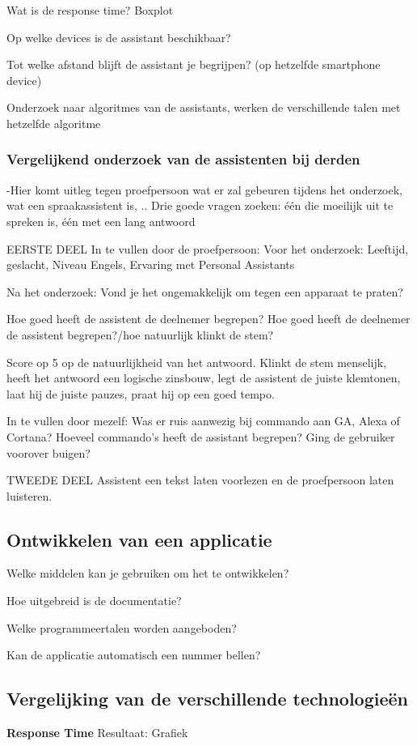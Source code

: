 Wat is de response time? Boxplot

Op welke devices is de assistant beschikbaar?

Tot welke afstand blijft de assistant je begrijpen? (op hetzelfde smartphone device)

Onderzoek naar algoritmes van de assistants, werken de verschillende talen met hetzelfde algoritme

\subsubsection{Vergelijkend onderzoek van de assistenten bij derden}
-Hier komt uitleg tegen proefpersoon wat er zal gebeuren tijdens het onderzoek, wat een spraakassistent is, ..
Drie goede vragen zoeken: één die moeilijk uit te spreken is, één met een lang antwoord

EERSTE DEEL
In te vullen door de proefpersoon:
Voor het onderzoek:
Leeftijd, geslacht, Niveau Engels, Ervaring met Personal Assistants

Na het onderzoek:
Vond je het ongemakkelijk om tegen een apparaat te praten?

Hoe goed heeft de assistent de deelnemer begrepen?
Hoe goed heeft de deelnemer de assistent begrepen?/hoe natuurlijk klinkt de stem?

Score op 5 op de natuurlijkheid van het antwoord. Klinkt de stem menselijk, heeft het antwoord een logische zinsbouw, legt de assistent de juiste klemtonen, laat hij de juiste pauzes, praat hij op een goed tempo.

In te vullen door mezelf:
Was er ruis aanwezig bij commando aan GA, Alexa of Cortana?
Hoeveel commando's heeft de assistant begrepen?
Ging de gebruiker voorover buigen?

TWEEDE DEEL
Assistent een tekst laten voorlezen en de proefpersoon laten luisteren.

\subsection{Ontwikkelen van een applicatie}
\label{sec:ontwikkelen van een applicatie}
Welke middelen kan je gebruiken om het te ontwikkelen?

Hoe uitgebreid is de documentatie?

Welke programmeertalen worden aangeboden?

Kan de applicatie automatisch een nummer bellen?

\subsection{Vergelijking van de verschillende technologieën}
\label{sec:vergelijking van de onderzochte technologieën}
\textbf{Response Time}
Resultaat: Grafiek

